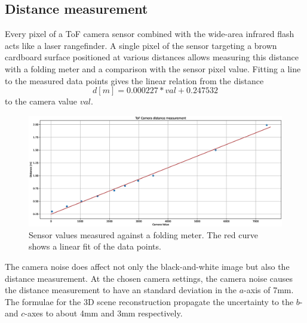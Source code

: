 \subsection{Distance measurement}
\label{sec:results_distance_meas}
Every pixel of a ToF camera sensor combined with the wide-area infrared flash acts like a laser rangefinder. A single pixel of the sensor targeting a brown cardboard surface positioned at various distances allows measuring this distance with a folding meter and a comparison with the sensor pixel value. Fitting a line to the measured data points gives the linear relation from the distance
\begin{equation*}
    d [m] = 0.000227 * val +0.247532
\end{equation*}
to the camera value $val$.
\begin{figure}[H]
  \centering
  \includegraphics[width=1.0\textwidth]{images/camera_distance_measurement.eps}
  \caption{Sensor values measured against a folding meter. The red curve shows a linear fit of the data points.}
  \label{im:distance_measurement}
\end{figure}
The camera noise does affect not only the black-and-white image but also the distance measurement. At the chosen camera settings, the camera noise causes the distance measurement to have an standard deviation in the $a$-axis of 7mm.\\
The formulae for the 3D scene reconstruction propagate the uncertainty to the $b$- and $c$-axes to about 4mm and 3mm respectively.
